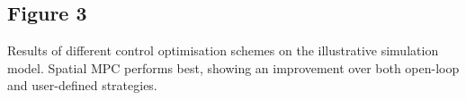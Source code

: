\subsection*{Figure 3}

Results of different control optimisation schemes on the illustrative simulation model. Spatial MPC performs best, showing an improvement over both open-loop and user-defined strategies.

%
%
%
%
%
%

